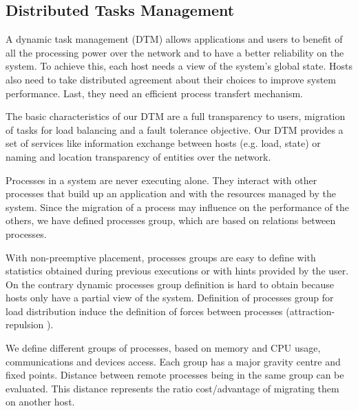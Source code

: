 \subsection {Distributed Tasks Management}

%

A dynamic task management (DTM) allows applications and users to benefit of all the 
processing power over the network and to have a better reliability on the system. 
To achieve this, each host needs a view of the system's global state.
Hosts also need to take distributed agreement about their choices to improve system performance. 
Last, they need an efficient process transfert mechanism.

The basic characteristics of our DTM are a full transparency to users, migration of tasks for 
load balancing and a fault tolerance objective. 
Our DTM provides a set of services like information exchange between hosts
(e.g. load, state) or
naming and location transparency of entities over the network.

Processes in a system are never executing alone. 
They interact with other processes that build up an application and with the resources managed by the system. 
Since the migration of a process may influence on the performance of the others, we have defined processes group,
which are based on relations between processes.

With non-preemptive placement, processes groups are easy to define with statistics obtained during previous executions or with 
hints provided by the user. 
On the contrary dynamic processes group definition is hard to obtain because hosts only have a partial view of the system. 
Definition of processes group for load distribution induce the definition of forces between processes 
(attraction-repulsion \cite {folliot:these,tokoro90}).

We define different groups of processes, based on memory and CPU usage, communications and devices access. 
Each group has a major gravity centre and fixed points. Distance between remote processes being in the same group
can be evaluated. This distance represents the ratio cost/advantage of migrating them on another host.


